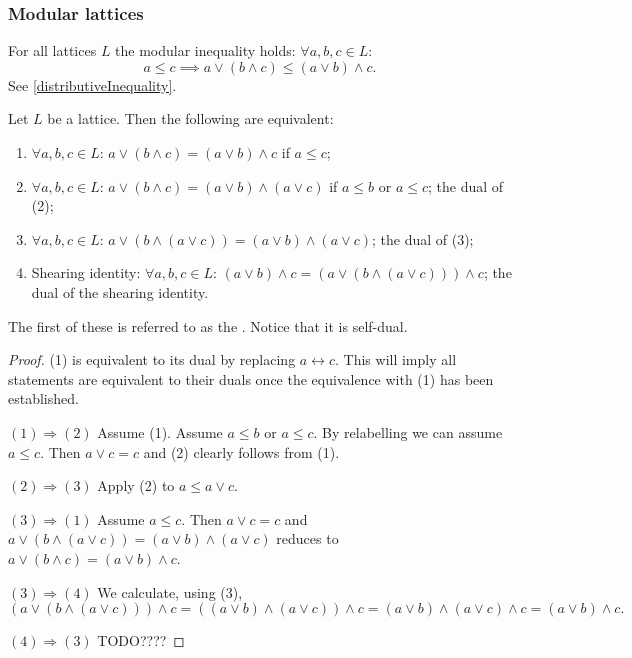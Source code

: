\subsubsection{Modular lattices}
For all lattices $L$ the modular inequality holds: $\forall a,b,c \in L$:
\[ a\leq c \implies a \vee (b\wedge c) \leq (a\vee b) \wedge c. \]
See \ref{distributiveInequality}.

\begin{proposition} \label{modularEquivalences}
Let $L$ be a lattice. Then the following are equivalent:
\begin{enumerate}
\item $\forall a,b,c\in L$: $a \vee (b\wedge c) = (a\vee b) \wedge c$ if $a\leq c$;
\item $\forall a,b,c\in L$: $a \vee (b\wedge c) = (a\vee b) \wedge (a\vee c)$ if $a\leq b$ or $a\leq c$; the dual of (2);
\item $\forall a,b,c\in L$: $a\vee (b\wedge (a\vee c)) = (a\vee b)\wedge (a\vee c)$; the dual of (3);
\item \textup{Shearing identity}: $\forall a,b,c\in L$: $(a\vee b) \wedge c = (a\vee (b\wedge (a\vee c)))\wedge c$; the dual of the shearing identity.
\end{enumerate}
\end{proposition}
The first of these is referred to as the . Notice that it is self-dual.
\begin{proof}
(1) is equivalent to its dual by replacing $a\leftrightarrow c$. This will imply all statements are equivalent to their duals once the equivalence with (1) has been established. 

$\boxed{(1)\Rightarrow (2)}$ Assume (1). Assume $a\leq b$ or $a\leq c$. By relabelling we can assume $a\leq c$.  Then $a\vee c = c$ and (2) clearly follows from (1).


$\boxed{(2)\Rightarrow (3)}$ Apply (2) to $a\leq a\vee c$.

$\boxed{(3)\Rightarrow (1)}$ Assume $a\leq c$. Then $a\vee c = c$ and $a\vee (b\wedge (a\vee c)) = (a\vee b)\wedge (a\vee c)$ reduces to $a \vee (b\wedge c) = (a\vee b) \wedge c$.

$\boxed{(3)\Rightarrow (4)}$ We calculate, using (3),
\[ (a\vee (b\wedge (a\vee c)))\wedge c = ((a\vee b)\wedge (a\vee c))\wedge c = (a\vee b) \wedge (a\vee c) \wedge c = (a\vee b) \wedge c. \]

$\boxed{(4)\Rightarrow (3)}$ TODO????
\end{proof}

